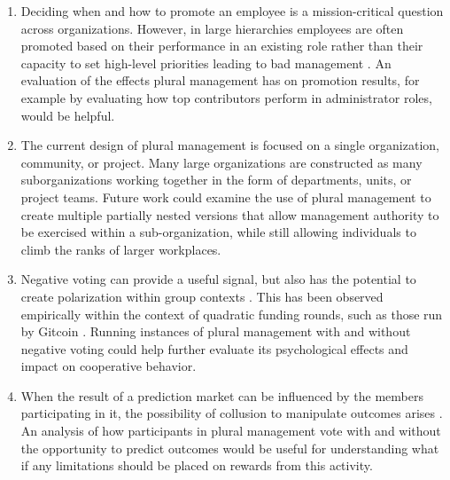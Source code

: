 \documentclass{article}
\begin{document}
\begin{enumerate}
    \item Deciding when and how to promote an employee is a mission-critical question across organizations. However, in large hierarchies employees are often promoted based on their performance in an existing role rather than their capacity to set high-level priorities leading to bad management \cite{benson2018promotions}. An evaluation of the effects plural management has on promotion results, for example by evaluating how top contributors perform in administrator roles, would be helpful.
    \item The current design of plural management is focused on a single organization, community, or project. Many large organizations are constructed as many suborganizations working together in the form of departments, units, or project teams. Future work could examine the use of plural management to create multiple partially nested versions that allow management authority to be exercised within a sub-organization, while still allowing individuals to climb the ranks of larger workplaces.
    \item Negative voting can provide a useful signal, but also has the potential to create polarization within group contexts \cite{weber2021negative}. This has been observed empirically within the context of quadratic funding rounds, such as those run by Gitcoin \cite{buterin2020gitcoin}. Running instances of plural management with and without negative voting could help further evaluate its psychological effects and impact on cooperative behavior.
    \item When the result of a prediction market can be influenced by the members participating in it, the possibility of collusion to manipulate outcomes arises \cite{ottaviani2007outcome}. An analysis of how participants in plural management vote with and without the opportunity to predict outcomes would be useful for understanding what if any limitations should be placed on rewards from this activity.
\end{enumerate}

\end{document}
